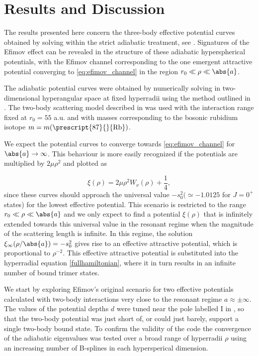 \chapter{Results and Discussion}\label{chap:7}
The results presented here concern the three-body effective potential curves obtained by solving  within the strict adiabatic treatment, see . Signatures of the Efimov effect can be revealed in the structure of these adiabatic hyperspherical potentials, with the Efimov channel corresponding to the one emergent attractive potential converging to \eqref{eq:efimov_channel} in the region $r_0 \ll \rho \ll
\abs{a}$.

The adiabatic potential curves were obtained by numerically solving  in  two-dimensional hyperangular space at fixed hyperradii using the method outlined in . The two-body scattering model described in  was used with the interaction range fixed at $r_0=55$ a.u. and with masses corresponding to the bosonic rubidium isotope $m = m( \prescript{87}{}{\mathrm{Rb}})$. 

We expect the potential curves to converge towards \eqref{eq:efimov_channel} for $\abs{a} \rightarrow \infty$. This behaviour is more easily recognized if the potentials are multiplied by $2 \mu \rho^2$ and plotted as 

\begin{equation}\label{eq:lambda}
\xi(\rho) = 2 \mu \rho^2 W_{\nu}(\rho) + \frac{1}{4},
\end{equation}
since these curves should approach the universal value $-s_0^2 (\simeq -1.0125$ for $J=0^+$ states) for the lowest effective potential. This scenario is restricted to the range $r_0 \ll \rho \ll \abs{a}$ and we only expect to find a potential $\xi(\rho)$ that is infinitely extended towards this universal value in the resonant regime when the magnitude of the scattering length is infinite. In this regime, the solution $\xi_{\infty}(\rho/\abs{a}) = -s_0^2$ gives rise to an effective attractive potential, which is proportional to $\rho^{-2}$. This effective attractive potential is substituted into the hyperradial equation \eqref{fullhamiltonian}, where it in turn results in an infinite number of bound trimer states.

We start by exploring Efimov's original scenario for two effective potentials calculated with two-body interactions very close to the resonant regime $a \approx \pm \infty$. The values of the potential depths $d$ were tuned near the pole labelled $\mathrm{I}$ in , so that the two-body potential was just short of, or could just barely, support a single two-body bound state. To confirm the validity of the code the convergence of the adiabatic eigenvalues was tested over a broad range of hyperradii $\rho$ using an increasing number of B-splines in each hypersperical dimension. 

